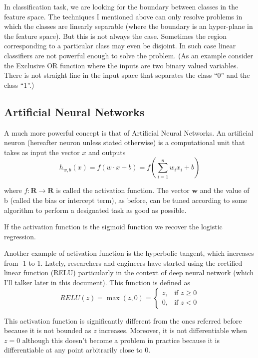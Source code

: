 \documentclass{article}
\begin{document}
In classification task, we are looking for the boundary between classes in the feature space. The techniques I mentioned above can only resolve problems in which the classes are linearly separable (where the boundary is an hyper-plane in the feature space). But this is not always the case. Sometimes the region corresponding to a particular class may even be disjoint. In such case linear classifiers are not powerful enough to solve the problem. (As an example consider the Exclusive OR function where the inputs are two binary valued variables. There is not straight line in the input space that separates the class “0” and the class “1”.)

\subsection{Artificial Neural Networks}
\label{subsec:ANN}

A much more powerful concept is that of Artificial Neural Networks. 
An artificial neuron (hereafter neuron unless stated otherwise) is a computational unit that takes as input the vector $x$ and outputs
\begin{equation}
h_{w,b} (x) = f\left( w \cdot x + b \right) = f \left( \sum_{i=1}^n w_i x_i + b  \right)
\end{equation}

where $f\colon \textbf{R} \rightarrow \textbf{R}$ is called the activation function. The vector $\textbf{w}$ and the value of b (called the bias or intercept term), as before, can be tuned according to some algorithm to perform a designated task as good as possible. 

If the activation function is the sigmoid function we recover the logistic regression.

Another example of activation function is the hyperbolic tangent, which increases from -1 to 1. 
Lately, researchers and engineers have started using the rectified linear function (RELU) particularly in the context of deep neural network (which I'll talker later in this document). This function is defined as
\begin{equation}
RELU(z)= \max(z,0) = 
\begin{cases}
    z,& \text{if } z\geq 0\\
    0,              & \text{if } z < 0
\end{cases}
\end{equation}

This activation function is significantly different from the ones referred before because it is not bounded as $z$ increases. Moreover, it is not differentiable when $z=0$ although this doesn't become a problem in practice because it is differentiable at any point arbitrarily close to 0.
\end{document}
